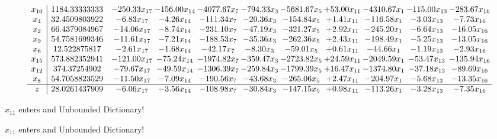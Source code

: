 \documentclass[9pt]{article}
\begin{document}
 \[\begin{array}{c| c c@{\hskip 2pt} c@{\hskip 2pt} c@{\hskip 2pt} c@{\hskip 2pt} c@{\hskip 2pt} c@{\hskip 2pt} c@{\hskip 2pt} c@{\hskip 2pt} c@{\hskip 2pt} }
 x_{10}   &  1184.33333333 & -250.33 x_{17} & -156.00 x_{14} & -4077.67 x_{7} & -794.33 x_{3} & -5681.67 x_{5} & + 53.00 x_{11} & -4310.67 x_{1} & -115.00 x_{13} & -283.67 x_{16}\\
 x_{4}   &  32.4509803922 & -6.83 x_{17} & -4.26 x_{14} & -111.34 x_{7} & -20.36 x_{3} & -154.84 x_{5} & +  1.41 x_{11} & -116.58 x_{1} & -3.03 x_{13} & -7.73 x_{16}\\
 x_{2}   &  66.4379084967 & -14.06 x_{17} & -8.74 x_{14} & -231.10 x_{7} & -47.19 x_{3} & -321.27 x_{5} & +  2.92 x_{11} & -245.20 x_{1} & -6.64 x_{13} & -16.05 x_{16}\\
 x_{9}   &  54.7581699346 & -11.61 x_{17} & -7.21 x_{14} & -188.53 x_{7} & -35.36 x_{3} & -262.36 x_{5} & +  2.43 x_{11} & -198.49 x_{1} & -5.25 x_{13} & -13.05 x_{16}\\
 x_{6}   &  12.522875817 & -2.61 x_{17} & -1.68 x_{14} & -42.17 x_{7} & -8.30 x_{3} & -59.01 x_{5} & +  0.61 x_{11} & -44.66 x_{1} & -1.19 x_{13} & -2.93 x_{16}\\
 x_{15}   &  573.882352941 & -121.00 x_{17} & -75.24 x_{14} & -1974.82 x_{7} & -359.47 x_{3} & -2723.82 x_{5} & + 24.59 x_{11} & -2049.59 x_{1} & -53.47 x_{13} & -135.94 x_{16}\\
 x_{12}   &  374.37254902 & -79.67 x_{17} & -49.59 x_{14} & -1306.39 x_{7} & -259.84 x_{3} & -1799.39 x_{5} & + 16.47 x_{11} & -1374.80 x_{1} & -37.18 x_{13} & -89.69 x_{16}\\
 x_{8}   &  54.7058823529 & -11.50 x_{17} & -7.09 x_{14} & -190.56 x_{7} & -43.68 x_{3} & -265.06 x_{5} & +  2.47 x_{11} & -204.97 x_{1} & -5.68 x_{13} & -13.35 x_{16}\\
\hline
z    &  28.0261437909 & -6.06 x_{17} & -3.56 x_{14} & -108.98 x_{7} & -30.84 x_{3} & -147.15 x_{5} & +  0.98 x_{11} & -113.26 x_{1} & -3.28 x_{13} & -7.35 x_{16}\\
\end{array}\]


 $ x_{11} $ enters and Unbounded Dictionary!


 $ x_{11} $ enters and Unbounded Dictionary!
\end{document}
